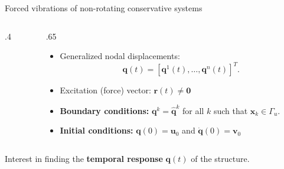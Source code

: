 \documentclass[aspectratio=169]{beamer}
\begin{document}
\begin{frame}{Forced vibrations of non-rotating conservative systems}
\begin{columns}[T]
\begin{column}{.4\textwidth}
\begin{center}
      \end{center}
    \end{column}
    \begin{column}{.65\textwidth}
      \vspace{-0.5cm}
      \begin{itemize}
        \item Generalized nodal displacements: $$\mathbf q(t)=[\mathbf q^1(t),\dots, \mathbf q^n(t)]^T.$$
        \item Excitation (force) vector: $\mathbf{r}(t)\neq \mathbf 0$
        \item \textbf{Boundary conditions:} $\mathbf q^k=\hat{\mathbf q}^k$ for all $k$ such that $\mathbf x_k\in\Gamma_u$.
        \item  \textbf{Initial conditions:} $\mathbf q(0)=\mathbf u_0$ and $\dot{\mathbf q}(0)=\mathbf v_0$
      \end{itemize}
    \end{column}
  \end{columns}
  \begin{block}{}
    \centering Interest in finding the \textbf{temporal response} $\mathbf q(t)$ of the structure.
  \end{block}
\end{frame}
\end{document}
